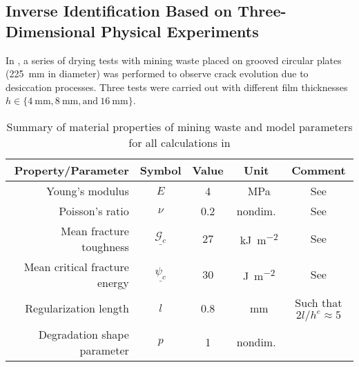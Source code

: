 \subsection{Inverse Identification Based on Three-Dimensional Physical Experiments}
\label{section: Chapter4/examples/3D}

In \citet{Rodriguez2006}, a series of drying tests with mining waste placed on grooved circular plates (\SI{225}{\milli\meter} in diameter) was performed to observe crack evolution due to desiccation processes. Three tests were carried out with different film thicknesses $h \in \{ \SI{4}{\milli\meter}, \SI{8}{\milli\meter}, \text{and}~\SI{16}{\milli\meter} \}$.

\begin{table}[htb!]
  \centering
  \caption{Summary of material properties of mining waste and model parameters for all calculations in }
  \begin{tabular}{r c c c c}
    \toprule
    Property/Parameter            & Symbol                      & Value & Unit                                & Comment                                                     \\
    \midrule
    Young's modulus               & $E$                         & 4     & \SI{}{\mega\pascal}                 & See \cite{sanchez2014modeling}                              \\
    Poisson's ratio               & $\nu$                       & 0.2   & nondim.                             & See \cite{sanchez2014modeling}                              \\
    Mean fracture toughness       & $\underline{\mathcal{G}_c}$ & 27    & \SI{}{\kilo\joule\per\square\meter} & See \cite{rodriguez2007experimental,lakshmikantha2009image} \\[5pt]
    Mean critical fracture energy & $\underline{\psi_c}$        & 30    & \SI{}{\joule\per\square\meter}      & See \cite{rodriguez2007experimental,lakshmikantha2009image} \\[5pt]
    Regularization length         & $l$                         & 0.8   & \SI{}{\milli\meter}                 & Such that $2l/h^e \approx 5$                                \\
    Degradation shape parameter   & $p$                         & 1     & nondim.                             &                                                             \\
    \bottomrule
  \end{tabular}
  \label{tab: MW}
\end{table}

